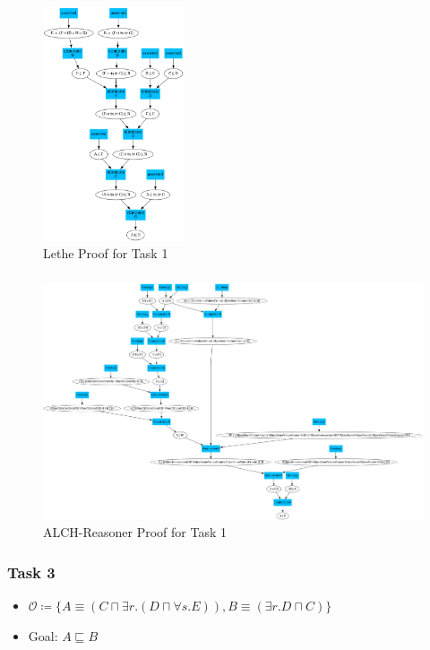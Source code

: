 \documentclass{beamer}
\begin{document}
            \begin{frame}
                \frametitle{}               
                \begin{figure}
                    \centering
                    \includegraphics[width=0.37\textwidth]{pictures/Lethe_task00001.png}
                    \caption{Lethe Proof for Task 1}
                  \end{figure}
             \end{frame}
            \begin{frame}
                \frametitle{}
                \begin{figure}
                    \centering
                    \includegraphics[width=1\textwidth]{pictures/ALCH_task00001.png}
                    \caption{ALCH-Reasoner Proof for Task 1}
                  \end{figure}
             \end{frame}

             \begin{frame}
                \frametitle{Task 3}
                    \begin{itemize}
                    \item $\mathcal{O} \coloneq \{A \equiv (C \sqcap \exists r.(D \sqcap \forall s.E)) , B \equiv (\exists r.D \sqcap C) \}$ \\
                    \item Goal: $A \sqsubseteq B$
                    \end{itemize}
                    

            \end{frame}
                
\end{document}
